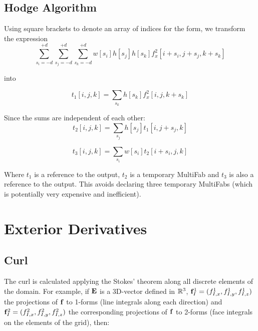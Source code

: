 \documentclass[11pt]{article}
\begin{document}
\subsection{Hodge Algorithm}

Using square brackets to denote an array of indices for the form, we transform the expression 
\begin{equation}
    \sum_{s_i = -d} ^ {+d} \sum_{s_j = -d} ^ {+d} \sum_{s_k = -d} ^ {+d} w[s_i]h[s_j]h[s_k] f_{x}^2 [i + s_i, j + s_j, k + s_k]
\end{equation}

into

\begin{equation}
    t_1 [i,j,k] = \sum_{s_k} h[s_k] f_x ^ 2[i, j, k + s_k]
\end{equation}

Since the sums are independent of each other:
\begin{equation}
    t_2 [i,j,k] = \sum_{s_j} h[s_j] t_1[i, j + s_j, k]
\end{equation}

\begin{equation}
    t_3 [i,j,k] = \sum_{s_i} w[s_i] t_2[i + s_i, j, k]
\end{equation}

Where $t_1$ is a reference to the output, $t_2$ is a temporary MultiFab and $t_3$ is also a reference to the output. This avoids declaring three temporary MultiFabs (which is potentially very expensive and inefficient).




\section{Exterior Derivatives}

\subsection{Curl}
\label{sec:curl}
The curl is calculated applying the Stokes' theorem along all discrete elements of the domain. For example, if $\mathbf{E}$ is a 3D-vector defined in $\mathbb{R}^3$, $\mathbf{f}^1_{I} = (f^1_{I,x}, f^1_{I,y}, f^1_{I,z})$ the projections of $\mathbf{f}$ to 1-forms (line integrals along each direction) and $\mathbf{f}^2_{I} = (f^2_{I,x}, f^2_{I,y}, f^2_{I,z})$ the corresponding projections of $\mathbf{f}$ to 2-forms (face integrals on the elements of the grid), then:
\end{document}
